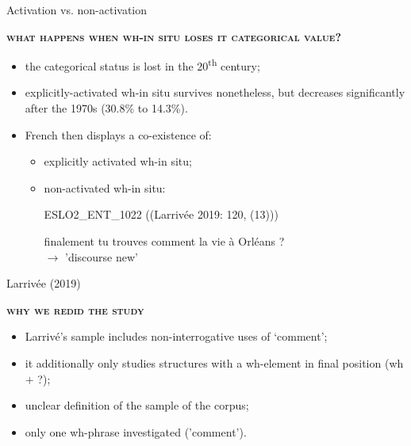 \documentclass[lesson_slides]{subfiles}
\begin{document}
\begin{frame}[c]{Activation vs. non-activation}

    \noindent \textbf{\textsc{what happens when wh-in situ loses it categorical value?}}\\ \pause
    \begin{itemize}
        \item[\ding{227}] the categorical status is lost in the 20\textsuperscript{th} century; \pause
        \item[\ding{227}] explicitly-activated wh-in situ survives nonetheless, but decreases significantly after the 1970s (30.8\% to 14.3\%). \pause
    \item[\ding{227}] French then displays a co-existence of: \pause
    \begin{itemize}
        \item explicitly activated wh-in situ; \pause
        \item non-activated wh-in situ:
        \begin{exe}
        \ex ESLO2\_ENT\_1022 ((Larrivée 2019: 120, (13))) \pause
            \begin{xlist}
             finalement tu trouves comment la vie à Orléans ?\\ \pause
            \hspace{5mm} $\longrightarrow$ 'discourse new'
            \end{xlist} 
            \end{exe}
    \end{itemize}
  \end{itemize}
\end{frame}
\begin{frame}[c]{Larrivée (2019)}

    \noindent \textbf{\textsc{why we redid the study}} \pause 
    \begin{itemize}
        \item[\ding{227}] Larrivé's sample includes non-interrogative uses of ‘comment’; \pause
        \item[\ding{227}] it additionally only studies structures with a wh-element in final position (wh $+$ ?); \pause 
        \item[\ding{227}] unclear definition of the sample of the corpus; \pause
        \item[\ding{227}] only one wh-phrase investigated ('comment').
    \end{itemize}
  
\end{frame}
\end{document}
